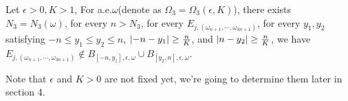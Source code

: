 \begin{thm}\label{omega3}
   Let $\epsilon>0,K>1$, For a.e.$\omega$(denote as $\Omega_3=\Omega_3(\epsilon,K)$), there exists $ N_3=N_3(\omega)$, for every $ n>N_3$, for every $ E_{j,(\omega_{n+1},\cdots,\omega_{3n+1})}$, for every $ y_1,y_2$ satisfying $-n\leq y_1\leq y_2\leq n$,  $\lvert-n-y_1\rvert\geq\frac{n}{K}$, and $\lvert n-y_2\rvert\geq\frac{n}{K}$,
 we have $E_{j,(\omega_{n+1},\cdots,\omega_{3n+1})}\notin B_{[-n,y_1],\epsilon,\omega}\cup B_{[y_2,n],\epsilon,\omega}$.
\end{thm}
\begin{remark}
  Note that $\epsilon$ and $K>0$ are not fixed yet, we're going to determine them later in section 4.
\end{remark}

